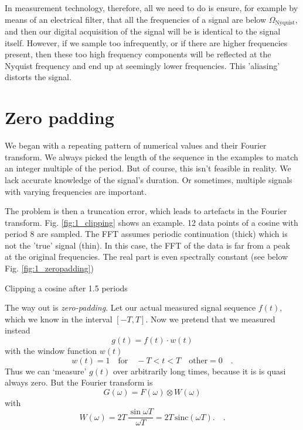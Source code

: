 In measurement technology, therefore, all we need to do is ensure, for example by means of an electrical filter, that all the frequencies of a signal are below
$\Omega_\text{Nyquist}$, and then our digital acquisition of the signal will be
is identical to the signal itself.
However, if we sample too infrequently, or if there are higher frequencies present, then these too high frequency components will be reflected at the 
Nyquist frequency and end up at seemingly lower frequencies. This 'aliasing' distorts the signal.
 



\section{Zero padding}


We began with a repeating pattern of numerical values and their
Fourier transform. We always picked the length of the sequence in the examples to match an integer multiple of the period.
But of course, this isn't feasible in reality. We lack accurate knowledge of the signal's duration.
Or sometimes, multiple signals with varying frequencies are important.

The problem is then a truncation error, which leads to artefacts in the
Fourier transform.  Fig. \ref{fig:1_clipping} shows an example. 12 data points of a cosine with period 8 are sampled. The FFT assumes periodic continuation (thick) which is not the 'true' signal (thin). In this case, the FFT of the data is far from a peak at the original frequencies. The real part is even spectrally constant (see below Fig. \ref{fig:1_zeropadding})

\begin{marginfigure}
  \caption{Clipping a cosine after 1.5 periods }
  \label{fig:1_clipping}
\end{marginfigure}



The way out is \emph{zero-padding}. Let our actual
measured signal sequence $f(t)$, which we know in the interval $[-T, T]$.
Now we pretend that we measured instead
\begin{equation}
g(t) = f(t) \cdot w(t)
\end{equation}
with the window function $w(t)$
\begin{equation}
w(t) = 1 \quad \text{for} \quad -T < t < T \quad \text{other} = 0 \quad .
\end{equation}
Thus we can `measure' $g(t)$ over arbitrarily long times, because it is
is quasi always zero. But the Fourier transform is
\begin{equation}
G(\omega) = F(\omega) \otimes W(\omega)
\end{equation}
with
\begin{equation}
W(\omega)= 2T \, \frac{\sin \omega T}{\omega T} = 2T \, \text{sinc}( \omega T). \quad .
\end{equation}

